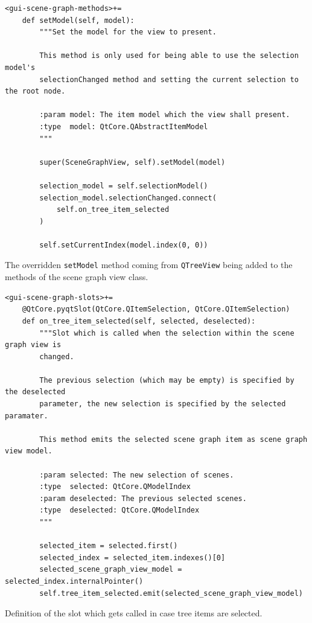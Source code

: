 \documentclass[10pt, openright, notitlepage]{scrreprt}
\begin{document}
\begin{listing}[H]
\begin{verbatim}
<gui-scene-graph-methods>+=
    def setModel(self, model):
        """Set the model for the view to present.
    
        This method is only used for being able to use the selection model's
        selectionChanged method and setting the current selection to the root node.
    
        :param model: The item model which the view shall present.
        :type  model: QtCore.QAbstractItemModel
        """
    
        super(SceneGraphView, self).setModel(model)
    
        selection_model = self.selectionModel()
        selection_model.selectionChanged.connect(
            self.on_tree_item_selected
        )
    
        self.setCurrentIndex(model.index(0, 0))
\end{verbatim}
\caption{\label{lst:gui-scene-graph-methods-set-model}
The overridden \texttt{setModel} method coming from \texttt{QTreeView} being added to the methods of the scene graph view class.}
\end{listing}

\begin{listing}[H]
\begin{verbatim}
<gui-scene-graph-slots>+=
    @QtCore.pyqtSlot(QtCore.QItemSelection, QtCore.QItemSelection)
    def on_tree_item_selected(self, selected, deselected):
        """Slot which is called when the selection within the scene graph view is
        changed.
    
        The previous selection (which may be empty) is specified by the deselected
        parameter, the new selection is specified by the selected paramater.
    
        This method emits the selected scene graph item as scene graph view model.
    
        :param selected: The new selection of scenes.
        :type  selected: QtCore.QModelIndex
        :param deselected: The previous selected scenes.
        :type  deselected: QtCore.QModelIndex
        """
    
        selected_item = selected.first()
        selected_index = selected_item.indexes()[0]
        selected_scene_graph_view_model = selected_index.internalPointer()
        self.tree_item_selected.emit(selected_scene_graph_view_model)
\end{verbatim}
\caption{\label{lst:gui-scene-graph-slots-01}
Definition of the slot which gets called in case tree items are selected.}
\end{listing}
\end{document}
